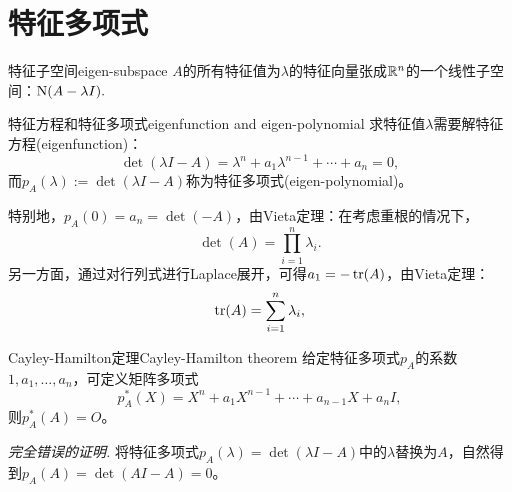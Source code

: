 \section{特征多项式}

\begin{definition}{特征子空间}{eigen-subspace}
	$A$的所有特征值为$\lambda$的特征向量张成$\mathbb R^n$的一个线性子空间：$\operatorname{N}(A-\lambda I).$
\end{definition}


\begin{definition}
	{特征方程和特征多项式}{eigenfunction and eigen-polynomial}
	求特征值$\lambda$需要解特征方程(eigenfunction)：
	\[
		\det(\lambda I-A)=\lambda^n+a_1\lambda^{n-1}+\cdots+a_n=0,
	\]
	而$p_A(\lambda):=\det(\lambda I-A)$称为特征多项式(eigen-polynomial)。
\end{definition}

\begin{corollary}
	特别地，$p_A(0)=a_n=\det(-A)$，由Vieta定理：在考虑重根的情况下，
	\begin{equation}
		\label{eqn:det lambda}
		\det(A)=\prod_{i=1}^n\lambda_i.
	\end{equation}
	另一方面，通过对行列式进行Laplace展开，可得$a_1=-\operatorname{tr}(A)$，由Vieta定理：
	\begin{equation}
		\label{eqn:trace lambda}
		\operatorname{tr}(A)=\sum_{i=1}^n\lambda_i,
	\end{equation}
\end{corollary}


\begin{theorem}
	{Cayley-Hamilton定理}{Cayley-Hamilton theorem}
	给定特征多项式$p_A$的系数$1,a_1,\ldots,a_n$，可定义矩阵多项式
	\begin{equation}
		p_A^*(X)=X^n+a_1X^{n-1}+\cdots+a_{n-1}X+a_nI,
	\end{equation}
	则$p_A^*(A)=O$。
\end{theorem}

\noindent
\textit{完全错误的证明.}
将特征多项式$p_A(\lambda)=\det(\lambda I-A)$中的$\lambda$替换为$A$，自然得到$p_A(A)=\det(AI-A)=0$。


